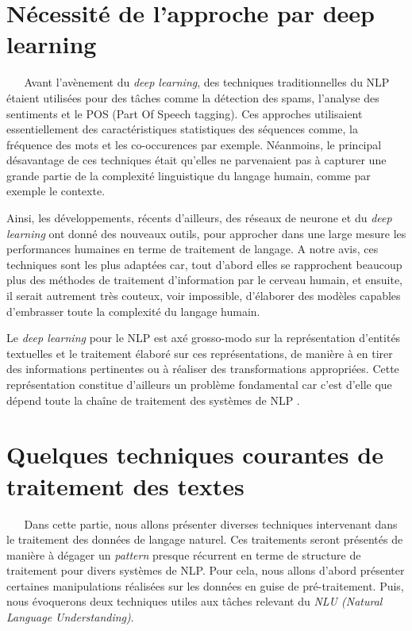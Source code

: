 \section{Nécessité de l'approche par deep learning}
$ _{} $ $ _{} $ $ _{} $ $ _{} $ $ _{} $Avant l'avènement du \textit{deep learning}, des techniques traditionnelles du NLP étaient u\-ti\-li\-sées pour des tâches comme la détection des spams, l'analyse des sentiments et le POS (Part Of Speech tagging). Ces approches utilisaient essentiellement des caractéristiques statistiques des séquences comme, la fréquence des mots et les co-occurences par exemple. Néanmoins, le principal désavantage de ces techniques était qu'elles ne parvenaient pas à capturer une grande partie de la complexité linguistique du langage humain, comme par exemple le contexte.

Ainsi, les développements, récents d'ailleurs, des réseaux de neurone et du \textit{deep learning} ont donné des nouveaux outils, pour approcher dans une large mesure les performances humaines en terme de traitement de langage. A notre avis, ces techniques sont les plus adaptées car, tout d'abord elles se rapprochent beaucoup plus des méthodes de traitement d'information par le cerveau humain, et ensuite, il serait autrement très couteux, voir impossible, d'élaborer des modèles capables d'embrasser toute la complexité du langage humain.

Le \textit{deep learning} pour le NLP est axé grosso-modo sur la représentation d'entités tex\-tu\-elles et le traitement élaboré sur ces représentations, de manière à en tirer des informations pertinentes ou à réaliser des transformations appropriées. Cette représentation constitue d'ailleurs un problème fondamental car c'est d'elle que dépend toute la chaîne de traitement des systèmes de NLP \cite{srivastava2021natural}.
\section{Quelques techniques courantes de traitement des textes}
$ _{} $ $ _{} $ $ _{} $ $ _{} $ $ _{} $Dans cette partie, nous allons présenter diverses techniques intervenant dans le trai\-te\-ment des données de langage naturel. Ces traitements seront présentés de manière à dégager un \textit{pattern} presque récurrent en terme de structure de traitement pour divers systèmes de NLP. Pour cela, nous allons d'abord présenter certaines manipulations réalisées sur les données en guise de pré-traitement. Puis, nous évoquerons deux techniques utiles aux tâches relevant du \textit{NLU (Natural Language Understanding)}.
